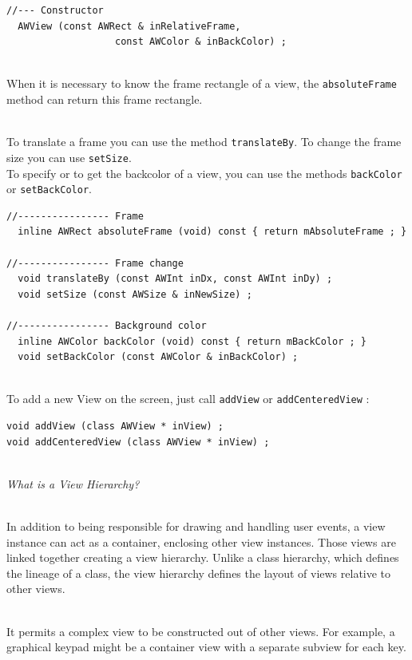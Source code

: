 \documentclass[a4paper,11pt]{extarticle}
\begin{document}
\begin{lstlisting}[language=Arduinonl]
//--- Constructor
  AWView (const AWRect & inRelativeFrame,
                   const AWColor & inBackColor) ;
 \end{lstlisting}

~\\ When it is necessary to know the frame rectangle of a view, the \texttt{absoluteFrame} method can return this frame rectangle.

~\\ To translate a frame you can use the method \texttt{translateBy}. To change the frame size you can use \texttt{setSize}.
~\\ To specify or to get the backcolor of a view, you can use the methods \texttt{backColor} or \texttt{setBackColor}.

\begin{lstlisting}[language=Arduinonl]
//---------------- Frame
  inline AWRect absoluteFrame (void) const { return mAbsoluteFrame ; }

//---------------- Frame change
  void translateBy (const AWInt inDx, const AWInt inDy) ;
  void setSize (const AWSize & inNewSize) ;

//---------------- Background color
  inline AWColor backColor (void) const { return mBackColor ; }
  void setBackColor (const AWColor & inBackColor) ;
\end{lstlisting}

~\\ To add a new View on the screen, just call \texttt{addView} or \texttt{addCenteredView} :
\begin{lstlisting}[language=Arduinonl]
void addView (class AWView * inView) ;
void addCenteredView (class AWView * inView) ;
\end{lstlisting}

~\\\emph{What is a View Hierarchy?}

~\\In addition to being responsible for drawing and handling user events, a view instance can act as a container, enclosing other view instances. Those views are linked together creating a view hierarchy. Unlike a class hierarchy, which defines the lineage of a class, the view hierarchy defines the layout of views relative to other views.

~\\ It permits a complex view to be constructed out of other views. For example, a graphical keypad might be a container view with a separate subview for each key.
\end{document}
